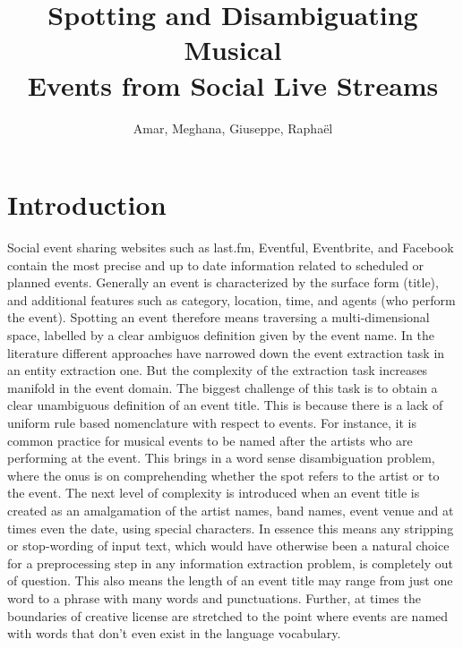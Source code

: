 \documentclass[10pt,a4paper]{article}
\author{Amar, Meghana, Giuseppe, Rapha\"el}
\title{Spotting and Disambiguating Musical\\Events from Social Live Streams}
\begin{document}
\maketitle
\section{Introduction}
\label{sec:introduction}
Social event sharing websites such as last.fm, Eventful, Eventbrite, and Facebook contain the most precise and up to date information related to scheduled or planned events. 
Generally an event is characterized by the surface form (title), and additional features such as category, location, time, and agents (who perform the event). Spotting an event therefore means traversing a multi-dimensional space, labelled by a clear ambiguos definition given by the event name. 
In the literature different approaches have narrowed down the event extraction task in an entity extraction one. But the complexity of the extraction task increases manifold in the event domain. The biggest challenge of this task is to obtain a clear unambiguous definition of an event title. This is because there is a lack of uniform rule based nomenclature with respect to events. 
For instance, it is common practice for musical events to be named after the artists who are performing at the event. 
This brings in a word sense disambiguation problem, where the onus is on comprehending whether the spot refers to the artist or to the event. The next level of complexity is introduced when an event title is created as an amalgamation of the artist names, band names, event venue and at times even the date, using special characters. %
In essence this means any stripping or stop-wording of input text, which would have otherwise been a natural choice for a preprocessing step in any information extraction problem, is completely out of question. This also means the length of an event title may range from just one word to a phrase with many words and punctuations. Further, at times the boundaries of creative license are stretched to the point where events are named with words that don't even exist in the language vocabulary. 
\end{document}
